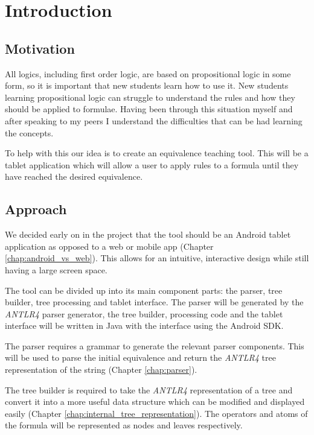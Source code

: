 \documentclass[draft]{report}
\begin{document}
\chapter{Introduction}

\section{Motivation}

All logics, including first order logic, are based on propositional logic in some form, so it is important that new students learn how to use it. New students learning propositional logic can struggle to understand the rules and how they should be applied to formulae. Having been through this situation myself and after speaking to my peers I understand the difficulties that can be had learning the concepts. 

To help with this our idea is to create an equivalence teaching tool. This will be a tablet application which will allow a user to apply rules to a formula until they have reached the desired equivalence.


\section{Approach}

We decided early on in the project that the tool should be an Android tablet application as opposed to a web or mobile app (Chapter \ref{chap:android_vs_web}). This allows for an intuitive, interactive design while still having a large screen space.

The tool can be divided up into its main component parts: the parser, tree builder, tree processing and tablet interface. The parser will be generated by the \emph{ANTLR4} parser generator, the tree builder, processing code and the tablet interface will be written in Java with the interface using the Android SDK.

The parser requires a grammar to generate the relevant parser components. This will be used to parse the initial equivalence and return the \emph{ANTLR4} tree representation of the string (Chapter \ref{chap:parser}).

The tree builder is required to take the \emph{ANTLR4} representation of a tree and convert it into a more useful data structure which can be modified and displayed easily (Chapter \ref{chap:internal_tree_representation}). The operators and atoms of the formula will be represented as nodes and leaves respectively.
\end{document}
